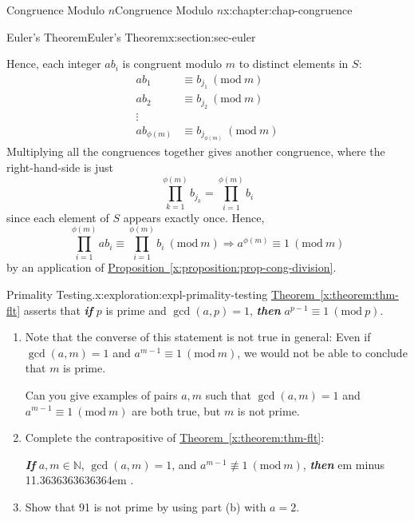 \documentclass[oneside,10pt,]{book}
\newcommand{\xreffont}{\relax}
\newcommand{\alert}[1]{\textbf{\textit{#1}}}
\newcommand{\fillin}[1]{\leavevmode\leaders\vrule height -1.2pt depth 1.5pt \hskip #1em minus #1em \null}
\numberwithin{equation}{section}
\newcommand{\Mod}[1]{\ \left(\mathrm{mod}\ #1\right)}
\newcommand{\amp}{&}
\begin{document}
\begin{chapterptx}{Congruence Modulo \(n\)}{}{Congruence Modulo \(n\)}{}{}{x:chapter:chap-congruence}
\begin{sectionptx}{Euler's Theorem}{}{Euler's Theorem}{}{}{x:section:sec-euler}
\par
Hence, each integer \(ab_i\) is congruent modulo \(m\) to distinct elements in \(S\):%
\begin{align*}
ab_1 \amp \equiv b_{j_1} \Mod{m}\\
ab_2 \amp \equiv b_{j_2} \Mod{m}\\
\vdots \amp\\
ab_{\phi(m)} \amp \equiv b_{j_{\phi(m)}} \Mod{m}
\end{align*}
Multiplying all the congruences together gives another congruence, where the right-hand-side is just%
\begin{equation*}
\displaystyle\prod_{k=1}^{\phi(m)} b_{j_k} = \displaystyle\prod_{i=1}^{\phi(m)} b_i
\end{equation*}
since each element of \(S\) appears exactly once. Hence,%
\begin{equation*}
\prod_{i=1}^{\phi(m)} ab_i \equiv \prod_{i=1}^{\phi(m)} b_i \Mod{m} \Rightarrow a^{\phi(m)} \equiv 1 \Mod{m}
\end{equation*}
by an application of \hyperref[x:proposition:prop-cong-division]{Proposition~{\xreffont\ref{x:proposition:prop-cong-division}}}.%
\begin{exploration}{Primality Testing.}{x:exploration:expl-primality-testing}%
\hyperref[x:theorem:thm-flt]{Theorem~{\xreffont\ref{x:theorem:thm-flt}}} asserts that \alert{if} \(p\) is prime and \(\gcd(a,p)=1\), \alert{then} \(a^{p-1} \equiv 1 \Mod{p}\).%
\begin{enumerate}[font=\bfseries,label=(\alph*),ref=\alph*]
\item{}Note that the converse of this statement is not true in general: Even if \(\gcd(a,m) = 1\) and \(a^{m-1} \equiv 1 \Mod{m}\), we would not be able to conclude that \(m\) is prime.%
\par
Can you give examples of pairs \(a, m\) such that \(\gcd(a,m) = 1\) and \(a^{m-1} \equiv 1 \Mod{m}\) are both true, but \(m\) is not prime.%
\item{}Complete the contrapositive of \hyperref[x:theorem:thm-flt]{Theorem~{\xreffont\ref{x:theorem:thm-flt}}}:%
\begin{sidebyside}{1}{0.1}{0.1}{0}%
\begin{sbspanel}{0.8}%
\alert{If} \(a,m \in \mathbb{N}\), \(\gcd(a,m) = 1\), and \(a^{m-1} \not\equiv 1 \Mod{m}\), \alert{then} \fillin{11.3636363636364}.%
\end{sbspanel}%
\end{sidebyside}%
\item{}Show that 91 is not prime by using part (b) with \(a = 2\).%

\end{enumerate}
\end{exploration}
\end{sectionptx}
\end{chapterptx}
\end{document}
